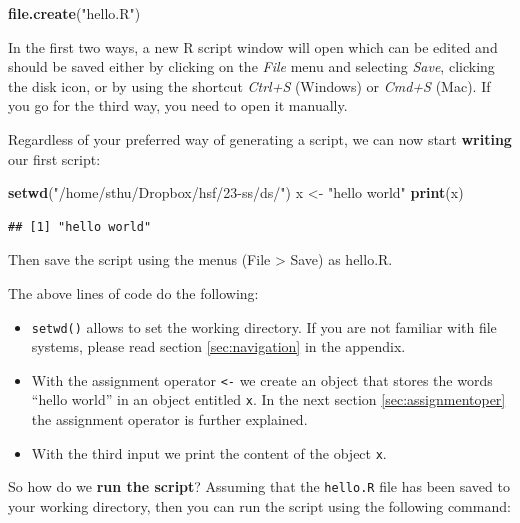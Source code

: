 \documentclass[
  12pt,
  oneside]{book}
\newenvironment{Shaded}{\begin{snugshade}}{\end{snugshade}}
\newcommand{\FunctionTok}[1]{\textcolor[rgb]{0.13,0.29,0.53}{\textbf{#1}}}
\newcommand{\NormalTok}[1]{#1}
\newcommand{\OtherTok}[1]{\textcolor[rgb]{0.56,0.35,0.01}{#1}}
\newcommand{\StringTok}[1]{\textcolor[rgb]{0.31,0.60,0.02}{#1}}
\providecommand{\tightlist}{%
  \setlength{\itemsep}{0pt}\setlength{\parskip}{0pt}}
\theoremstyle{definition}
\theoremstyle{definition}
\theoremstyle{definition}
\theoremstyle{definition}
\theoremstyle{remark}
\begin{document}
\begin{Shaded}
\begin{Highlighting}[]
\FunctionTok{file.create}\NormalTok{(}\StringTok{"hello.R"}\NormalTok{)}
\end{Highlighting}
\end{Shaded}

In the first two ways, a new R script window will open which can be edited and should be saved either by clicking on the \emph{File} menu and selecting \emph{Save}, clicking the disk icon, or by using the shortcut \emph{Ctrl+S} (Windows) or \emph{Cmd+S} (Mac).
If you go for the third way, you need to open it manually.

Regardless of your preferred way of generating a script, we can now start \textbf{writing} our first script:

\begin{Shaded}
\begin{Highlighting}[]
\FunctionTok{setwd}\NormalTok{(}\StringTok{"/home/sthu/Dropbox/hsf/23{-}ss/ds/"}\NormalTok{)}
\NormalTok{x }\OtherTok{\textless{}{-}} \StringTok{"hello world"}
\FunctionTok{print}\NormalTok{(x)}
\end{Highlighting}
\end{Shaded}

\begin{verbatim}
## [1] "hello world"
\end{verbatim}

Then save the script using the menus (File \textgreater{} Save) as hello.R.

The above lines of code do the following:

\begin{itemize}
\tightlist
\item
  \texttt{setwd()} allows to set the working directory. If you are not familiar with file systems, please read section \ref{sec:navigation} in the appendix.
\item
  With the assignment operator \texttt{\textless{}-} we create an object that stores the words ``hello world'' in an object entitled \texttt{x}. In the next section \ref{sec:assignmentoper} the assignment operator is further explained.
\item
  With the third input we print the content of the object \texttt{x}.
\end{itemize}

So how do we \textbf{run the script}? Assuming that the \texttt{hello.R} file has been saved to your working directory, then you can run the script using the following command:
\end{document}
